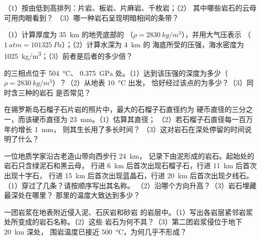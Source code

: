 \begin{exercise}[$\star$]\label{exo:g12:metamorphic-rocks:5}
（1）按由低到高排列：片岩、板岩、片麻岩、千枚岩；（2）
其中哪些岩石的云母可用肉眼看到？
（3）哪一种岩石呈现明暗相间的条带？
\end{exercise}

\begin{exercise}[$\star\star$]\label{exo:g12:metamorphic-rocks:6}
（1）计算厚度为 \qty{35}{km} 的地壳底部的
（$\rho = \qty{2830}{kg/m^3}$），并用大气压表示
（$\qty{1}{atm} = \qty{101325}{Pa}$）；（2）计算水深为 \qty{4}{km} 的
海底所受的压强，海水密度为
\qty{1025}{kg/m^3}；（3）前者是后者的多少倍？
\end{exercise}

\begin{exercise}[$\star\star$]\label{exo:g12:metamorphic-rocks:7}
 的三相点位于 \qty{504}{\celsius}、
\qty{0.375}{GPa} 处。（1）达到该压强的深度为多少（$\rho =
\qty{2830}{kg/m^3}$）？（2）从地表 \qty{10}{\celsius} 出发，
恰好经过该点的为多少？（3）同时含三种的岩石
是否常见？
\end{exercise}

\begin{exercise}[$\star\star$]\label{exo:g12:metamorphic-rocks:8}
在锡罗斯岛石榴子石片岩的照片中，最大的石榴子石直径约为
硬币直径的三分之一，而该硬币直径为 \qty{23}{mm}。（1）估算其直径；
（2）若石榴子石直径每一百万年约增长 \qty{1}{mm}，
则其生长用了多长时间？
（3）这对岩石在深处停留的时间说明了什么？
\end{exercise}

\begin{exercise}[$\star\star$]\label{exo:g12:metamorphic-rocks:9}
一位地质学家沿古老造山带向西步行 \qty{24}{km}，
记录下由泥形成的岩石。起始处的岩石只含绿泥石和黑云母，
行进 \qty{6}{km} 后首次出现石榴子石，行进 \qty{11}{km} 后首次出现十字石，
行进 \qty{15}{km} 后首次出现蓝晶石，行进
\qty{20}{km} 后首次出现夕线石。（1）穿过了几条？请按顺序写出其名称。
（2）沿哪个方向升高？（3）岩石埋藏最深处在哪里？
那里的温度大致达到多少？
\end{exercise}

\begin{exercise}[$\star\star$]\label{exo:g12:metamorphic-rocks:10}
一团岩浆在地表附近侵入泥、石灰岩和砂岩
的岩层中。（1）写出各岩层紧邻岩浆处所变成的岩石名称。（2）这些
岩石为何不具？（3）第二团岩浆侵位于地下 \qty{20}{km} 深处，
围岩温度已接近 \qty{500}{\celsius}，为何几乎不形成？
\end{exercise}

